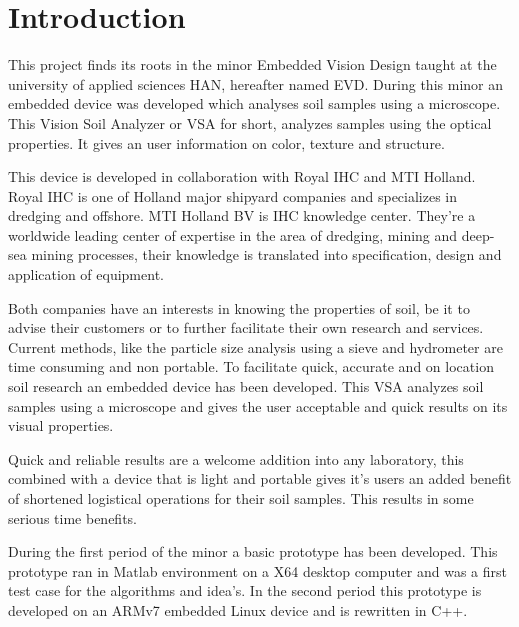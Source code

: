 \documentclass[11pt,fleqn,,a4paper,twoside,openright]{book}
\begin{document}
\tableofcontents %

\cleardoublepage %

\pagestyle{fancy} %

\chapter{Introduction}
This project finds its roots in the minor Embedded Vision Design taught at the university of applied sciences HAN, hereafter named EVD. During this minor an embedded device was developed which analyses soil samples using a microscope. This Vision Soil Analyzer or VSA for short, analyzes samples using the optical properties. It gives an user information on color, texture and structure.

This device is developed in collaboration with Royal IHC and MTI Holland. Royal IHC is one of Holland major shipyard companies and specializes in dredging and offshore. MTI Holland BV is IHC knowledge center. They're a worldwide leading center of expertise in the area of dredging, mining and deep-sea mining processes, their knowledge is translated into specification, design and application of equipment.

Both companies have an interests in knowing the properties of soil, be it to advise their customers or to further facilitate their own research and services. Current methods, like the particle size analysis using a sieve and hydrometer are time consuming and non portable. To facilitate quick, accurate and on location soil research an embedded device has been developed. This VSA analyzes soil samples using a microscope and gives the user acceptable and quick results on its visual properties.

Quick and reliable results are a welcome addition into any laboratory, this combined with a device that is light and portable gives it's users an added benefit of shortened logistical operations for their soil samples. This results in some serious time benefits.

During the first period of the minor a basic prototype has been developed. This prototype ran in Matlab environment on a X64 desktop computer and was a first test case for the algorithms and idea's. In the second period this prototype is developed on an ARMv7 embedded Linux device and is rewritten in C++.
\end{document}

